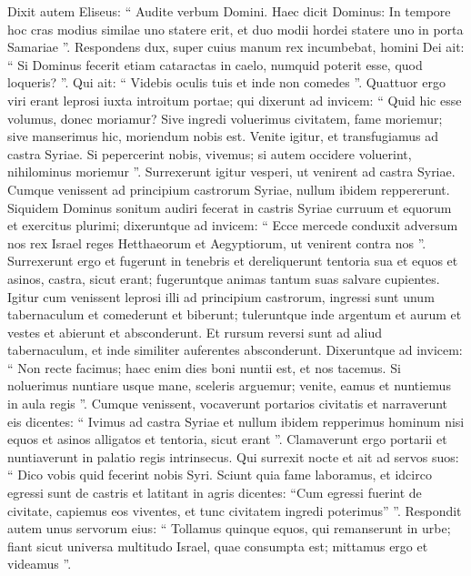 \begin{biblechapter}
\begin{biblechapter}
\begin{biblechapter}
\begin{biblechapter}
\begin{biblechapter}
\begin{biblechapter}
\begin{biblechapter}
 \verse Dixit autem Eliseus: “ Audite verbum Domini. Haec dicit Dominus: In tempore hoc cras modius similae uno statere erit, et duo modii hordei statere uno in porta Samariae ”. 
\verse Respondens dux, super cuius manum rex incumbebat, homini Dei ait: “ Si Dominus fecerit etiam cataractas in caelo, numquid poterit esse, quod loqueris? ”. Qui ait: “ Videbis oculis tuis et inde non comedes ”.
 \verse Quattuor ergo viri erant leprosi iuxta introitum portae; qui dixerunt ad invicem: “ Quid hic esse volumus, donec moriamur? 
\verse Sive ingredi voluerimus civitatem, fame moriemur; sive manserimus hic, moriendum nobis est. Venite igitur, et transfugiamus ad castra Syriae. Si pepercerint nobis, vivemus; si autem occidere voluerint, nihilominus moriemur ”. 
\verse Surrexerunt igitur vesperi, ut venirent ad castra Syriae. Cumque venissent ad principium castrorum Syriae, nullum ibidem reppererunt.
 \verse Siquidem Dominus sonitum audiri fecerat in castris Syriae curruum et equorum et exercitus plurimi; dixeruntque ad invicem: “ Ecce mercede conduxit adversum nos rex Israel reges Hetthaeorum et Aegyptiorum, ut venirent contra nos ”. 
\verse Surrexerunt ergo et fugerunt in tenebris et dereliquerunt tentoria sua et equos et asinos, castra, sicut erant; fugeruntque animas tantum suas salvare cupientes.
 \verse Igitur cum venissent leprosi illi ad principium castrorum, ingressi sunt unum tabernaculum et comederunt et biberunt; tuleruntque inde argentum et aurum et vestes et abierunt et absconderunt. Et rursum reversi sunt ad aliud tabernaculum, et inde similiter auferentes absconderunt.
 \verse Dixeruntque ad invicem: “ Non recte facimus; haec enim dies boni nuntii est, et nos tacemus. Si noluerimus nuntiare usque mane, sceleris arguemur; venite, eamus et nuntiemus in aula regis ”. 
\verse Cumque venissent, vocaverunt portarios civitatis et narraverunt eis dicentes: “ Ivimus ad castra Syriae et nullum ibidem repperimus hominum nisi equos et asinos alligatos et tentoria, sicut erant ”.
 \verse Clamaverunt ergo portarii et nuntiaverunt in palatio regis intrinsecus. 
 \verse Qui surrexit nocte et ait ad servos suos: “ Dico vobis quid fecerint nobis Syri. Sciunt quia fame laboramus, et idcirco egressi sunt de castris et latitant in agris dicentes: “Cum egressi fuerint de civitate, capiemus eos viventes, et tunc civitatem ingredi poterimus” ”. 
\verse Respondit autem unus servorum eius: “ Tollamus quinque equos, qui remanserunt in urbe; fiant sicut universa multitudo Israel, quae consumpta est; mittamus ergo et videamus ”. 

\end{biblechapter}
\end{biblechapter}
\end{biblechapter}
\end{biblechapter}
\end{biblechapter}
\end{biblechapter}
\end{biblechapter}

